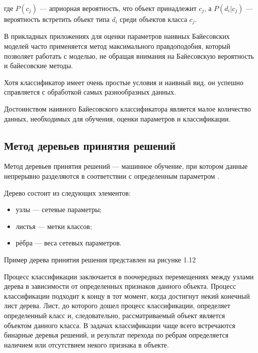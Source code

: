 где $P(c_j)$ --- априорная вероятность, что объект принадлежит $c_j$, а $P(d_i|c_j)$ --- вероятность встретить объект типа $d_i$ среди объектов класса $c_j$.

В прикладных приложениях для оценки параметров наивных Байесовских моделей часто применяется метод максимального правдоподобия, который позволяет работать с моделью, не обращая внимания на Байесовскую вероятность и байесовские методы.

Хотя классификатор имеет очень простые условия и наивный вид, он успешно справляется с обработкой самых разнообразных данных.

Достоинством наивного Байесовского классификатора является малое количество данных, необходимых для обучения, оценки параметров и классификации.



\subsection{Метод деревьев принятия решений}
Метод деревьев принятия решений --- машинное обучение, при котором
данные непрерывно разделяются в соответствии с определенным параметром \cite[]{classifiers}.

Дерево состоит из следующих элементов:

\begin{itemize}
    \item узлы --- сетевые параметры;
    \item листья --- метки классов;
    \item рёбра --- веса сетевых параметров.
\end{itemize}

Пример дерева принятия решения представлен на рисунке 1.12


Процесс классификации заключается в поочередных перемещениях между
узлами дерева в зависимости от определенных признаков данного объекта.
Процесс классификации подходит к концу в тот момент, когда достигнут некий
конечный лист дерева. Лист, до которого дошел процесс классификации,
определяет определенный класс и, следовательно, рассматриваемый объект
является объектом данного класса. В задачах классификации чаще всего
встречаются бинарные деревья решений, и результат перехода по ребрам
определяется наличием или отсутствием некого признака в объекте.


